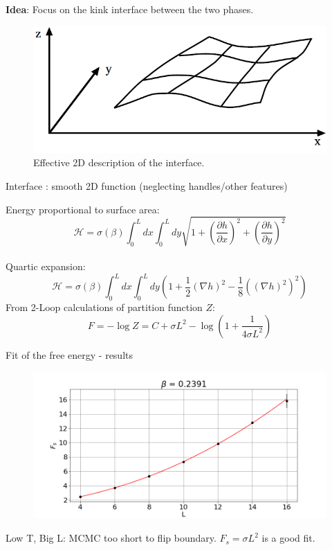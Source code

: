 \documentclass[12pt,handout]{beamer}
\begin{document}
\begin{frame}
\begin{center}
\vspace{5pt}
\textbf{Idea}: Focus on the kink interface between the two phases.

\begin{figure}[!htb]
\centering
\includegraphics[scale=0.4]{CWM.png}
\caption{\centering Effective 2D description of the interface.}
\end{figure}
Interface : smooth 2D function (neglecting handles/other features)
\end{center}
\end{frame}

\begin{frame}

\begin{center}
Energy proportional to surface area:
\[
\mathcal H = \sigma\left(\beta \right) \int _0 ^{L} dx \int _0 ^{L} dy \sqrt{1 + \left(\frac{\partial h}{\partial x}\right)^2 + \left(\frac{\partial h}{\partial y}\right)^2}
\]\\
Quartic expansion:
\[
	\mathcal H  = \sigma\left(\beta \right) \int _0 ^{L} dx \int _0 ^{L} dy \left( 1 + \frac{1}{2}\left(\nabla{h}\right) ^2 - \frac{1}{8}\left(\left(\nabla{h}\right) ^2\right) ^2 \right)
\]
From 2-Loop calculations of partition function $Z$:
\[
F = -\log Z = C + \sigma L ^2 - \log\left( 1 + \frac{1}{4\sigma L^2}\right)
\]
\end{center}
\end{frame}

\begin{frame}{Fit of the free energy - results}\begin{center}
\begin{figure}[!htb]
\centering
\includegraphics[scale=0.4, center]{02391.png}
\end{figure}
Low T, Big L: MCMC too short to flip boundary. $F_s = \sigma L^2$ is a good fit.
\end{center}
\end{frame}
\end{document}
